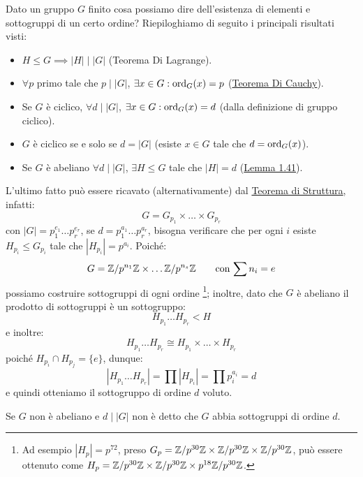 \documentclass[11pt]{scrartcl}
\begin{document}
\begin{remark}
    Dato un gruppo $G$ finito cosa possiamo dire dell'esistenza di elementi e sottogruppi di un certo ordine? Riepiloghiamo di seguito i principali risultati visti:
        \begin{itemize}
            \item $H \leqslant G \implies |H| \mid |G|$ (Teorema Di Lagrange).
            \item $\forall p$ primo tale che $p \mid |G|$, $\exists x \in G : \operatorname{ord}_G(x) = p$ (\hyperref[p:Cauchy]{Teorema Di Cauchy}).
            \item Se $G$ è ciclico, $\forall d \mid |G|$, $\exists x \in G : \operatorname{ord}_G(x) = d$ (dalla definizione di gruppo ciclico).
            \item $G$ è ciclico se e solo se $d = |G|$ (esiste $x \in G$ tale che $d = \operatorname{ord}_G(x)$).
            \item Se $G$ è abeliano $\forall d \mid |G|$, $\exists H \leqslant G$ tale che $|H| = d$ (\hyperref[davide]{Lemma 1.41}).
        \end{itemize}
\end{remark}
L'ultimo fatto può essere ricavato (alternativamente) dal \hyperref[t:struttura]{Teorema di Struttura}, infatti:
    \[ G = G_{p_1} \times \ldots \times G_{p_r}
        \]
con $|G| = p_1^{e_1}\ldots p_r^{e_r}$, se $d = p_1^{a_1}\ldots p_r^{a_r}$, bisogna verificare che per ogni $i$ esiste $H_{p_i} \leqslant G_{p_i}$ tale che $|H_{p_i}| = p^{a_i}$.
Poiché:
    \[ G = \mathbb{Z}/{p^{n_1}}\mathbb{Z} \times \ldots \mathbb{Z}/{p^{n_s}}\mathbb{Z} \qquad \text{con $\sum n_i = e$}
        \]
possiamo costruire sottogruppi di ogni ordine \footnote{Ad esempio $|H_p| = p^{72}$, preso $G_p = \mathbb{Z}/{p^{30}}\mathbb{Z} \times \mathbb{Z}/{p^{30}}\mathbb{Z} \times \mathbb{Z}/{p^{30}}\mathbb{Z}$, può essere ottenuto come $H_p = \mathbb{Z}/{p^{30}}\mathbb{Z} \times \mathbb{Z}/{p^{30}}\mathbb{Z} \times p^{18} \mathbb{Z}/{p^{30}}\mathbb{Z}$.};
inoltre, dato che $G$ è abeliano il prodotto di sottogruppi è un sottogruppo:
    \[ H_{p_1}\ldots H_{p_r} < H
        \]
e inoltre:
    \[ H_{p_1}\ldots H_{p_r} \cong H_{p_1} \times \ldots \times H_{p_r}
        \]
poiché $H_{p_i} \cap H_{p_j} = \{e\}$, dunque:
    \[ |H_{p_1}\ldots H_{p_r}| = \prod |H_{p_i}| = \prod p_{i}^{a_i} = d
        \]
e quindi otteniamo il sottogruppo di ordine $d$ voluto.
    
\begin{remark}
    Se $G$ non è abeliano e $d \mid |G|$ non è detto che $G$ abbia sottogruppi di ordine $d$.
\end{remark}
\end{document}
